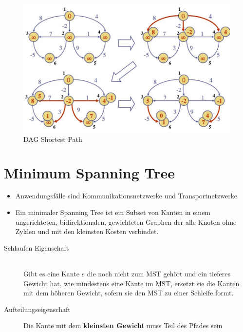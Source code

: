 \begin{figure}[h]
\centering
\includegraphics[width=0.7\linewidth]{images/dag_shortest_path}
\caption{DAG Shortest Path}
\label{fig:dagshortestpath}
\end{figure}


\section{Minimum Spanning Tree}
\begin{itemize}
	\item Anwendungsfälle sind Kommunikationsnetzwerke und Transportnetzwerke
	\item Ein minimaler Spanning Tree ist ein Subset von Kanten in einem ungerichteten, bidirektionalen, gewichteten Graphen der alle Knoten ohne Zyklen und mit den kleinsten Kosten verbindet.
\end{itemize}

\begin{description}
	\item[Schlaufen Eigenschaft] \hfill \\
	Gibt es eine Kante $e$ die noch nicht zum MST gehört und ein tieferes Gewicht hat, wie mindestens eine Kante im MST, ersetzt sie die Kanten mit dem höheren Gewicht, sofern sie den MST zu einer Schleife formt.
	\item[Aufteilungseigenschaft] Die Kante mit dem \textbf{kleinsten Gewicht} muss Teil des Pfades sein
\end{description}

